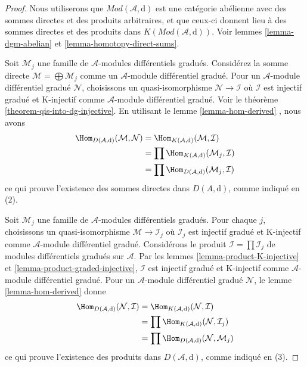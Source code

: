 \begin{proof}
Nous utiliserons que $\textit{Mod}(\mathcal{A}, \text{d})$ est une catégorie abélienne avec des sommes directes et des produits arbitraires, et que ceux-ci donnent lieu à des sommes directes et des produits dans $K(\textit{Mod}(\mathcal{A}, \text{d}))$.
Voir lemmes \ref{lemma-dgm-abelian}  et \ref{lemma-homotopy-direct-sums}.

\medskip\noindent
Soit $\mathcal{M}_j$ une famille de $\mathcal{A}$-modules différentiels gradués.
Considérez la somme directe $\mathcal{M} = \bigoplus \mathcal{M}_j$ comme un $\mathcal{A}$-module différentiel gradué.
Pour un $\mathcal{A}$-module différentiel gradué $\mathcal{N}$, choisissons un quasi-isomorphisme $\mathcal{N} \to \mathcal{I}$ où $\mathcal{I}$ est injectif gradué et K-injectif comme $\mathcal{A}$-module différentiel gradué.
Voir le théorème \ref{theorem-qis-into-dg-injective}.
En utilisant le lemme \ref{lemma-hom-derived} , nous avons
\begin{align*}
\Hom_{D(\mathcal{A}, \text{d})}(\mathcal{M}, \mathcal{N})
& =
\Hom_{K(\mathcal{A}, \text{d})}(\mathcal{M}, \mathcal{I}) \\
& =
\prod \Hom_{K(\mathcal{A}, \text{d})}(\mathcal{M}_j, \mathcal{I}) \\
& =
\prod \Hom_{D(\mathcal{A}, \text{d})}(\mathcal{M}_j, \mathcal{I})
\end{align*}
ce qui prouve l'existence des sommes directes dans $D(A, \text{d})$, comme indiqué en (2).

\medskip\noindent
Soit $\mathcal{M}_j$ une famille de $\mathcal{A}$-modules différentiels gradués.
Pour chaque $j$, choisissons un quasi-isomorphisme $\mathcal{M} \to \mathcal{I}_j$ où $\mathcal{I}_j$ est injectif gradué et K-injectif comme $\mathcal{A}$-module différentiel gradué.
Considérons le produit $\mathcal{I} = \prod \mathcal{I}_j$ de modules différentiels gradués sur $\mathcal{A}$.
Par les lemmes \ref{lemma-product-K-injective} et \ref{lemma-product-graded-injective}, $\mathcal{I}$ est injectif gradué et K-injectif comme $\mathcal{A}$-module différentiel gradué.
Pour un $\mathcal{A}$-module différentiel gradué $\mathcal{N}$, le lemme \ref{lemma-hom-derived} donne
\begin{align*}
\Hom_{D(\mathcal{A}, \text{d})}(\mathcal{N}, \mathcal{I})
& =
\Hom_{K(\mathcal{A}, \text{d})}(\mathcal{N}, \mathcal{I}) \\
& =
\prod \Hom_{K(\mathcal{A}, \text{d})}(\mathcal{N}, \mathcal{I}_j) \\
& =
\prod \Hom_{D(\mathcal{A}, \text{d})}(\mathcal{N}, \mathcal{M}_j)
\end{align*}
ce qui prouve l'existence des produits dans $D(\mathcal{A}, \text{d})$, comme indiqué en (3).
\end{proof}







